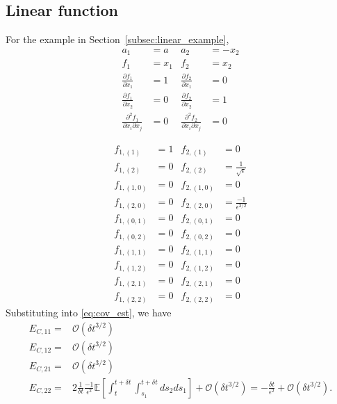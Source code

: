 \documentclass[12pt]{article}
\begin{document}
\subsection{Linear function}

For the example in Section~\ref{subsec:linear_example}, 
\begin{equation}
\begin{aligned}
a_1 &= a 
&
a_2 &= -x_2
\\
f_1 &= x_1 
&
f_2 &= x_2 
\\
\frac{\partial f_1}{\partial x_1} &= 1
&
\frac{\partial f_2}{\partial x_1} &= 0 
\\
\frac{\partial f_1}{\partial x_2} &= 0
&
\frac{\partial f_2}{\partial x_2} &= 1 
\\
\frac{\partial^2 f_1}{\partial x_i \partial x_j} &= 0
&
\frac{\partial^2 f_2}{\partial x_i \partial x_j} &= 0
\end{aligned}
\end{equation}

\begin{equation}
\begin{aligned}
f_{1,(1)} &= 1
&
f_{2,(1)} &= 0
\\
f_{1,(2)} &= 0
&
f_{2,(2)} &= \frac{1}{\sqrt{\epsilon}}
\\
f_{1,(1,0)} &= 0
&
f_{2,(1,0)} &= 0
\\
f_{1,(2,0)} &= 0
&
f_{2,(2,0)} &= \frac{-1}{\epsilon^{3/2}} 
\\
f_{1,(0,1)} &= 0
&
f_{2,(0,1)} &= 0
\\
f_{1,(0,2)} &= 0
&
f_{2,(0,2)} &= 0
\\
f_{1,(1,1)} &= 0
&
f_{2,(1,1)} &= 0
\\
f_{1,(1,2)} &= 0
&
f_{2,(1,2)} &= 0
\\
f_{1,(2,1)} &= 0
&
f_{2,(2,1)} &= 0
\\
f_{1,(2,2)} &= 0
&
f_{2,(2,2)} &= 0
\end{aligned}
\end{equation}
%
Substituting into \eqref{eq:cov_est}, we have
\begin{equation}
\begin{aligned}
E_{C, 11} =& \mathcal{O} (\delta t^{3/2}) \\
E_{C,12} =& \mathcal{O} (\delta t^{3/2}) \\
E_{C,21} =& \mathcal{O} (\delta t^{3/2}) \\
E_{C,22} =&
2 \frac{1}{\delta t}\frac{-1}{\epsilon^2} \mathbb{E} \left[ \int_t^{t+\delta t} \int_{s_1}^{t+\delta t} ds_2 ds_1 \right] + \mathcal{O} (\delta t^{3/2})
= - \frac{\delta t}{\epsilon^2} + \mathcal{O} (\delta t^{3/2}) .
\end{aligned}
\end{equation}
\end{document}
